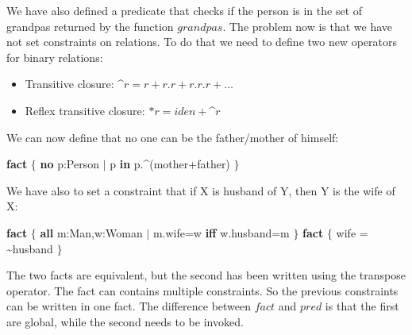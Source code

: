 \documentclass[12pt, a4paper]{report}
\newtheorem[style=M,bodystyle=\normalfont]{theorem}{Theorem}
\newtheorem[style=M,bodystyle=\normalfont]{corollary}{Corollary}
\newtheorem[style=M,bodystyle=\normalfont]{lemma}{Lemma}
\newtheorem[style=M,bodystyle=\normalfont]{definition}{Definition}
\begin{document}
    We have also defined a predicate that checks if the person is in the set of grandpas returned by the function $grandpas$. The problem now is that we have not set constraints 
    on relations. To do that we need to define two new operators for binary relations:
    \begin{itemize}
        \item Transitive closure: \textasciicircum $r=r+r.r+r.r.r+\dots$
        \item Reflex transitive closure: $*r=iden+$\textasciicircum$r$
    \end{itemize}
    We can now define that no one can be the father/mother of himself: 
    \begin{algorithmic}[H]
        \State \textbf{fact} $\{$
        \State \:\:\:\:\:\:\:\: \textbf{no} p:Person $\mid$ p \textbf{in} p.\textasciicircum(mother+father)
        \State $\}$
    \end{algorithmic} 
    We have also to set a constraint that if X is husband of Y, then Y is the wife of X:
    \begin{algorithmic}[H]
        \State \textbf{fact} $\{$
        \State \:\:\:\:\:\:\:\: \textbf{all} m:Man,w:Woman $\mid$ m.wife=w \textbf{iff} w.husband=m
        \State $\}$
        \State \textbf{fact} $\{$
        \State \:\:\:\:\:\:\:\: wife = \textasciitilde husband
        \State $\}$
    \end{algorithmic} 
    The two facts are equivalent, but the second has been written using the transpose operator. The fact can contains multiple constraints. So the previous constraints can be written 
    in one fact. The difference between $fact$ and $pred$ is that the first are global, while the second needs to be invoked.

\newpage
\end{document}
